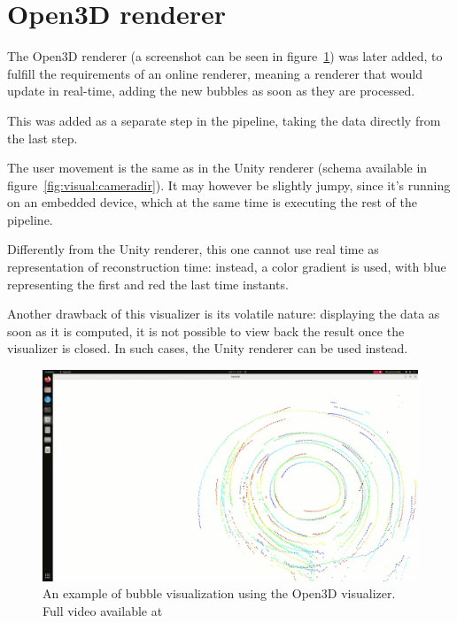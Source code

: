 \section{Open3D renderer}
\label{sec:visual:o3d}

The Open3D renderer (a screenshot can be seen in figure~\ref{sec:visual:o3d}) was later added, to fulfill the requirements of an online renderer, meaning a renderer that would update in real-time, adding the new bubbles as soon as they are processed.

This was added as a separate step in the pipeline, taking the data directly from the last step.

The user movement is the same as in the Unity renderer (schema available in figure~\ref{fig:visual:cameradir}).
It may however be slightly jumpy, since it's running on an embedded device, which at the same time is executing the rest of the pipeline.

Differently from the Unity renderer, this one cannot use real time as representation of reconstruction time: instead, a color gradient is used, with blue representing the first and red the last time instants.

Another drawback of this visualizer is its volatile nature: displaying the data as soon as it is computed, it is not possible to view back the result once the visualizer is closed.
In such cases, the Unity renderer can be used instead.

\begin{figure}
	\centerline{\includegraphics[width=\locateimgsize]{images/visual/o3d.png}}
	\caption{\centering An example of bubble visualization using the Open3D visualizer. Full video available at~\cite{visual-o3d}}
	\label{fig:visual:o3d}
\end{figure}
